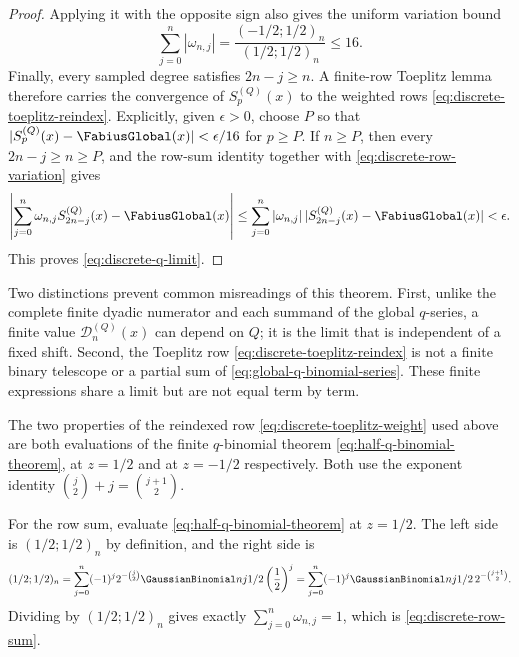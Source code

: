 \documentclass[11pt,oneside]{article}
\theoremstyle{definition}
\theoremstyle{remark}
\begin{document}
\begin{proof}
Applying it with the opposite sign also gives the uniform variation bound
\begin{equation}
 \sum_{j=0}^{n}|\omega_{n,j}|
 =\frac{(-1/2;1/2)_n}{(1/2;1/2)_n}\le16.                 \label{eq:discrete-row-variation}
\end{equation}
Finally, every sampled degree satisfies $2n-j\ge n$.  A finite-row Toeplitz lemma therefore
carries the convergence of $S_p^{(Q)}(x)$ to the weighted rows
\eqref{eq:discrete-toeplitz-reindex}.  Explicitly, given $\epsilon>0$, choose $P$ so that
$|S_p^{(Q)}(x)-\FabiusGlobal(x)|<\epsilon/16$ for $p\ge P$.  If $n\ge P$, then every
$2n-j\ge n\ge P$, and the row-sum identity together with
\eqref{eq:discrete-row-variation} gives
\begin{equation*}
 \left|\sum_{j=0}^{n}\omega_{n,j}S_{2n-j}^{(Q)}(x)-\FabiusGlobal(x)\right|
 \le\sum_{j=0}^{n}|\omega_{n,j}|\,
 |S_{2n-j}^{(Q)}(x)-\FabiusGlobal(x)|<\epsilon.
\end{equation*}
This proves \eqref{eq:discrete-q-limit}.
\end{proof}

Two distinctions prevent common misreadings of this theorem.  First, unlike the complete
finite dyadic numerator and each summand of the global $q$-series, a finite value
$\mathcal D_n^{(Q)}(x)$ can depend on $Q$; it is the limit that is independent of a fixed
shift.  Second, the Toeplitz row \eqref{eq:discrete-toeplitz-reindex} is not a finite binary
telescope or a partial sum of \eqref{eq:global-q-binomial-series}.  These finite expressions
share a limit but are not equal term by term.

The two properties of the reindexed row \eqref{eq:discrete-toeplitz-weight} used above are
both evaluations of the finite $q$-binomial theorem \eqref{eq:half-q-binomial-theorem}, at
$z=1/2$ and at $z=-1/2$ respectively.  Both use the exponent identity
$\binom j2+j=\binom{j+1}2$.

For the row sum, evaluate \eqref{eq:half-q-binomial-theorem} at $z=1/2$.  The left side is
$(1/2;1/2)_n$ by definition, and the right side is
\begin{equation}
 (1/2;1/2)_n
 =\sum_{j=0}^{n}(-1)^j2^{-\binom j2}\GaussianBinomial nj{1/2}\left(\frac12\right)^{j}
 =\sum_{j=0}^{n}(-1)^j\GaussianBinomial nj{1/2}\,2^{-\binom{j+1}2}.  \label{eq:qs-row-sum-derivation}
\end{equation}
Dividing by $(1/2;1/2)_n$ gives exactly $\sum_{j=0}^{n}\omega_{n,j}=1$, which is
\eqref{eq:discrete-row-sum}.
\end{document}
